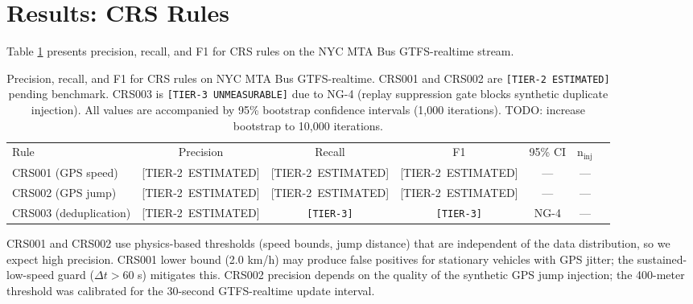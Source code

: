 \section{Results: CRS Rules}
\label{sec:results-crs}

Table \ref{tab:results-crs} presents precision, recall, and F1 for CRS
rules on the NYC MTA Bus GTFS-realtime stream.

\begin{table}[htbp]
  \centering
  \caption{Precision, recall, and F1 for CRS rules on NYC MTA Bus GTFS-realtime.
    CRS001 and CRS002 are \texttt{[TIER-2\ ESTIMATED]} pending benchmark.
    CRS003 is \texttt{[TIER-3\ UNMEASURABLE]} due to NG-4
    (replay suppression gate blocks synthetic duplicate injection).
    All values are accompanied by 95\% bootstrap confidence intervals
    (1,000 iterations). TODO: increase bootstrap to 10,000 iterations.}
  \label{tab:results-crs}
  \begin{tabular}{lcccccc}
    \toprule
    \multirow{2}{*}{Rule} & \multirow{2}{*}{Precision} & \multirow{2}{*}{Recall}
    & \multirow{2}{*}{F1} & \multirow{2}{*}{95\% CI} &
    \multirow{2}{*}{n$_{\text{inj}}$} \\
    & & & & & \\
    \midrule
    CRS001 (GPS speed)   & [TIER-2\ ESTIMATED] & [TIER-2\ ESTIMATED]
                         & [TIER-2\ ESTIMATED] & — & — \\[4pt]
    CRS002 (GPS jump)    & [TIER-2\ ESTIMATED] & [TIER-2\ ESTIMATED]
                         & [TIER-2\ ESTIMATED] & — & — \\[4pt]
    CRS003 (deduplication)& [TIER-2\ ESTIMATED] & \cellcolor[gray]{0.85}
                         \texttt{[TIER-3]} & \cellcolor[gray]{0.85}
                         \texttt{[TIER-3]} & \cellcolor[gray]{0.85} NG-4
                         & \cellcolor[gray]{0.85} — \\
    \bottomrule
  \end{tabular}
\end{table}

CRS001 and CRS002 use physics-based thresholds (speed bounds, jump distance)
that are independent of the data distribution, so we expect high precision.
CRS001 lower bound (2.0 km/h) may produce false positives for stationary
vehicles with GPS jitter; the sustained-low-speed guard ($\Delta t > 60$ s)
mitigates this. CRS002 precision depends on the quality of the synthetic
GPS jump injection; the 400-meter threshold was calibrated for the 30-second
GTFS-realtime update interval.


